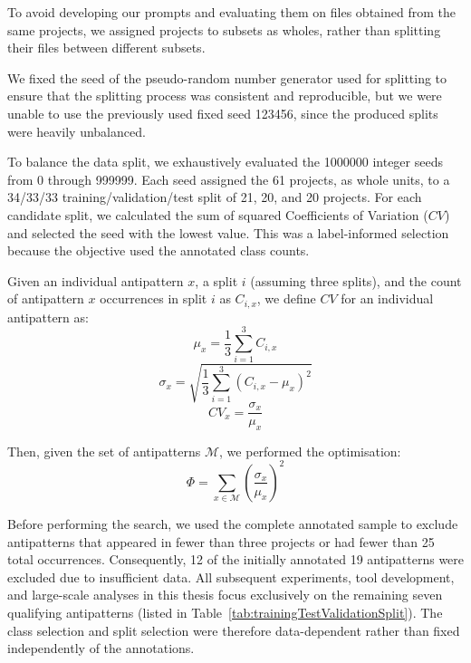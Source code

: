 To avoid developing our prompts and evaluating them on files obtained from the same projects, we assigned projects to subsets as wholes, rather than splitting their files between different subsets.

We fixed the seed of the pseudo-random number generator used for splitting to ensure that the splitting process was consistent and reproducible, but we were unable to use the previously used fixed seed \num{123456}, since the produced splits were heavily unbalanced.

To balance the data split, we exhaustively evaluated the \num{1000000} integer seeds from \num{0} through \num{999999}. Each seed assigned the \num{61} projects, as whole units, to a \num{34}/\num{33}/\num{33} training/validation/test split of \num{21}, \num{20}, and \num{20} projects. For each candidate split, we calculated the sum of squared Coefficients of Variation (\(CV\)) and selected the seed with the lowest value. This was a label-informed selection because the objective used the annotated class counts.

Given an individual antipattern \(x\), a split \(i\) (assuming three splits), and the count of antipattern \(x\) occurrences in split \(i\) as \(C_{i,x}\), we define \(CV\) for an individual antipattern as:
\begin{equation}
\mu_x = \frac{1}{3} \sum_{i=1}^{3} C_{i,x}
\end{equation}
\begin{equation}
\sigma_x = \sqrt{\frac{1}{3} \sum_{i=1}^{3} (C_{i,x} - \mu_x)^2}
\end{equation}
\begin{equation}
CV_x = \frac{\sigma_x}{\mu_x}
\end{equation}

Then, given the set of antipatterns \(\mathcal{M}\), we performed the optimisation:
\begin{equation}
\Phi = \sum_{x \in \mathcal{M}} \left( \frac{\sigma_x}{\mu_x} \right)^2
\end{equation}

Before performing the search, we used the complete annotated sample to exclude antipatterns that appeared in fewer than three projects or had fewer than \num{25} total occurrences. Consequently, 12 of the initially annotated 19 antipatterns were excluded due to insufficient data. All subsequent experiments, tool development, and large-scale analyses in this thesis focus exclusively on the remaining seven qualifying antipatterns (listed in Table~\ref{tab:trainingTestValidationSplit}). The class selection and split selection were therefore data-dependent rather than fixed independently of the annotations.

